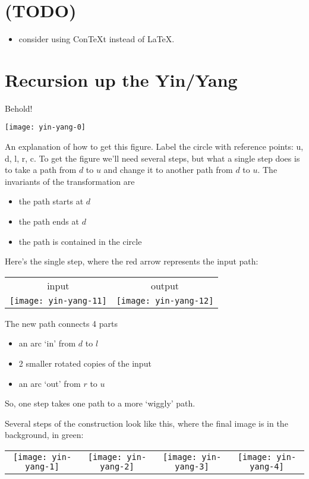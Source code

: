 \documentclass{article}
\begin{document}
\section{(TODO)}
\begin{itemize}
\item consider using ConTeXt instead of \LaTeX.
\end{itemize}
\section{Recursion up the Yin/Yang}
Behold!
\begin{center}
\texttt{[image: yin-yang-0]}
\end{center}

An explanation of how to get this figure.
Label the circle with reference points: u, d, l, r, c.
To get the figure we'll need several steps, but what
a single step does is to take a path from $d$ to $u$
and change it to another path from $d$ to $u$.
The invariants of the transformation are
\begin{itemize}
\item the path starts at $d$
\item the path ends at $d$
\item the path is contained in the circle
\end{itemize}
Here's the single step, where the red arrow represents the input path:
\begin{center}
\begin{tabular}{cc}
input & output \\
\texttt{[image: yin-yang-11]} &
\texttt{[image: yin-yang-12]} \\
\end{tabular}
\end{center}
The new path connects 4 parts
\begin{itemize}
\item an arc `in' from $d$ to $l$
\item 2 smaller rotated copies of the input
\item an arc `out' from $r$ to $u$
\end{itemize}
So, one step takes one path to a more `wiggly' path.

Several steps of the construction look like this, where
the final image is in the background, in green:
\begin{center}
\begin{tabular}{cccc}
\texttt{[image: yin-yang-1]} &
\texttt{[image: yin-yang-2]} &
\texttt{[image: yin-yang-3]} &
\texttt{[image: yin-yang-4]} \\
\end{tabular}
\end{center}
\end{document}
